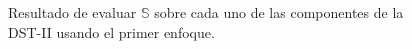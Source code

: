 \begin{figure}
\begin{multicols}{2}
    \end{multicols}
\begin{multicols}{2}
	\par
	\par
\end{multicols}
\caption{Resultado de evaluar $\mathbb{S}$ sobre cada uno de las componentes de la DST-II usando el primer enfoque.} \label{fig:gaussian-example-approach1}
\end{figure}


